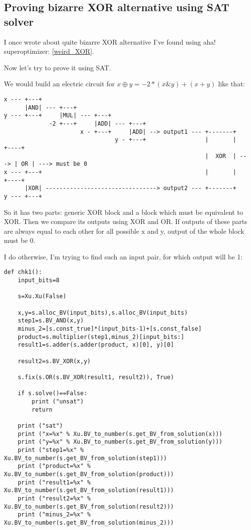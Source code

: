 \subsection{Proving bizarre XOR alternative using SAT solver}
\label{weird_XOR_SAT}

I once wrote about quite bizarre XOR alternative I've found using aha! superoptimizer: \ref{weird_XOR}.

Now let's try to prove it using SAT.

We would build an electric circuit for $x \oplus y = -2*(x \& y) + (x + y)$ like that:

\begin{lstlisting}
x --- +---+
      |AND| --- +---+     
y --- +---+     |MUL| --- +---+
             -2 +---+     |ADD| --- +---+
                      x - +---+     |ADD| --> output1 --- +-------+
                                y - +---+                 |       |      +----+
                                                          |  XOR  | ---> | OR | ---> must be 0
x --- +---+                                               |       |      +----+
      |XOR| --------------------------------> output2 --- +-------+
y --- +---+
\end{lstlisting}

So it has two parts: generic XOR block and a block which must be equivalent to XOR.
Then we compare its outputs using XOR and OR.
If outputs of these parts are always equal to each other for all possible x and y, output of the whole block must be 0.

I do otherwise, I'm trying to find such an input pair, for which output will be 1:

\begin{lstlisting}
def chk1():
    input_bits=8

    s=Xu.Xu(False)

    x,y=s.alloc_BV(input_bits),s.alloc_BV(input_bits)
    step1=s.BV_AND(x,y)
    minus_2=[s.const_true]*(input_bits-1)+[s.const_false]
    product=s.multiplier(step1,minus_2)[input_bits:]
    result1=s.adder(s.adder(product, x)[0], y)[0]

    result2=s.BV_XOR(x,y)

    s.fix(s.OR(s.BV_XOR(result1, result2)), True)

    if s.solve()==False:
        print ("unsat")
        return

    print ("sat")
    print ("x=%x" % Xu.BV_to_number(s.get_BV_from_solution(x)))
    print ("y=%x" % Xu.BV_to_number(s.get_BV_from_solution(y)))
    print ("step1=%x" % Xu.BV_to_number(s.get_BV_from_solution(step1)))
    print ("product=%x" % Xu.BV_to_number(s.get_BV_from_solution(product)))
    print ("result1=%x" % Xu.BV_to_number(s.get_BV_from_solution(result1)))
    print ("result2=%x" % Xu.BV_to_number(s.get_BV_from_solution(result2)))
    print ("minus_2=%x" % Xu.BV_to_number(s.get_BV_from_solution(minus_2)))
\end{lstlisting}

